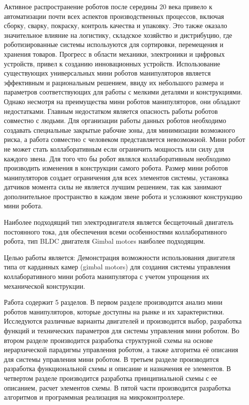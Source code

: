 

Активное распространение роботов после середины 20 века привело к автоматизации почти всех аспектов производственных процессов, включая сборку, сварку, покраску, контроль качества и упаковку. Это также оказало значительное влияние на логистику, складское хозяйство
и дистрибуцию, где роботизированные системы используются для сортировки, перемещения и
хранения товаров. Прогресс в области механики, электроники и цифровых устройств, привел к
созданию инновационных устройств. 
Использование существующих универсальных мини роботов манипуляторов является эффективным и рациональным решением, ввиду их небольшого размера и параметров соответствующих для работы с мелкими деталями и конструкциями. Однако несмотря на преимущества мини роботов манипуляторов, они обладают недостатками. Главным недостатком является опасность работы роботов совместно с людьми. Для организации работы данных роботов необходимо создавать специальные закрытые рабочие зоны, для минимизации возможного риска, а работа совместно с человеком представляется невозможной.  Мини робот не может стать коллаборативным если ограничить мощность или силу для каждого звена. Для того что бы робот являлся коллаборативным необходимо производить изменения в конструкции самого робота. Размер мини роботов манипуляторов создает ограничения
для всех элементов системы, установка датчиков момента силы не является лучшим решением,
так как занимают дополнительное пространство в каждом звене робота и усложняют конструкцию мини робота. 

Наиболее подходящий тип электродвигателя является бесщеточный двигатель постоянного тока, для обеспечения всеми особенностями коллаборативного робота, тип BLDC двигателя Gimbal motors наиболее подходящим. 

Целью работы является: Демонстрация возможности использования двигателя типа от карданных камер (gimbal motors) для создания системы управления коллаборативного мини робота манипулятора с учетом упрощения их механической конструкции.

Работа содержит 5 разделов. В первом разделе производится анализ мини роботов манипуляторов, которые доступны на рынке и их характеристики. Исследуются различные варианты двигателей и производится выбор, разработка функций и технических параметров для системы управления мини роботом.  Во втором разделе производится разработка структурной схемы на основе иерархической парадигмы управления роботом, а также алгоритма её описания для системы управления мини роботом. В третьем разделе производится разработка функциональной схемы и описание и назначения ее элементов. В четвертом разделе производится разработка принципиальной схемы с ее описанием, расчет элементов схемы. В пятой части производится разработка алгоритмов и программная реализация на микроконтроллере. 
